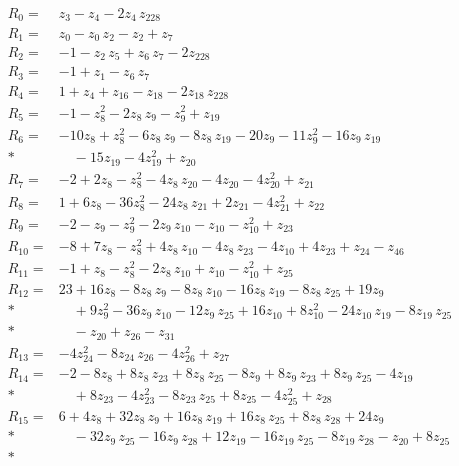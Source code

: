 \documentclass[11pt]{article}
\theoremstyle{remark}\newtheorem{remark}[theorem]{Remark}
\begin{document}
\begingroup
\small
\setlength{\jot}{3pt}
\allowdisplaybreaks[4]
\begin{align*}
R_{0}={}& z_{3} - z_{4} - 2z_{4}\,z_{228} \\[2pt]
R_{1}={}& z_{0} - z_{0}\,z_{2} - z_{2} + z_{7} \\[2pt]
R_{2}={}& -1 - z_{2}\,z_{5} + z_{6}\,z_{7} - 2z_{228} \\[2pt]
R_{3}={}& -1 + z_{1} - z_{6}\,z_{7} \\[2pt]
R_{4}={}& 1 + z_{4} + z_{16} - z_{18} - 2z_{18}\,z_{228} \\[2pt]
R_{5}={}& -1 - z_{8}^{2} - 2z_{8}\,z_{9} - z_{9}^{2} + z_{19} \\[2pt]
R_{6}={}& -10z_{8} + z_{8}^{2} - 6z_{8}\,z_{9} - 8z_{8}\,z_{19} - 20z_{9} - 11z_{9}^{2} - 16z_{9}\,z_{19} \\*
&\quad  - 15z_{19} - 4z_{19}^{2} + z_{20} \\[2pt]
R_{7}={}& -2 + 2z_{8} - z_{8}^{2} - 4z_{8}\,z_{20} - 4z_{20} - 4z_{20}^{2} + z_{21} \\[2pt]
R_{8}={}& 1 + 6z_{8} - 36z_{8}^{2} - 24z_{8}\,z_{21} + 2z_{21} - 4z_{21}^{2} + z_{22} \\[2pt]
R_{9}={}& -2 - z_{9} - z_{9}^{2} - 2z_{9}\,z_{10} - z_{10} - z_{10}^{2} + z_{23} \\[2pt]
R_{10}={}& -8 + 7z_{8} - z_{8}^{2} + 4z_{8}\,z_{10} - 4z_{8}\,z_{23} - 4z_{10} + 4z_{23} + z_{24} - z_{46} \\[2pt]
R_{11}={}& -1 + z_{8} - z_{8}^{2} - 2z_{8}\,z_{10} + z_{10} - z_{10}^{2} + z_{25} \\[2pt]
R_{12}={}& 23 + 16z_{8} - 8z_{8}\,z_{9} - 8z_{8}\,z_{10} - 16z_{8}\,z_{19} - 8z_{8}\,z_{25} + 19z_{9} \\*
&\quad  + 9z_{9}^{2} - 36z_{9}\,z_{10} - 12z_{9}\,z_{25} + 16z_{10} + 8z_{10}^{2} - 24z_{10}\,z_{19} - 8z_{19}\,z_{25} \\*
&\quad  - z_{20} + z_{26} - z_{31} \\[2pt]
R_{13}={}& -4z_{24}^{2} - 8z_{24}\,z_{26} - 4z_{26}^{2} + z_{27} \\[2pt]
R_{14}={}& -2 - 8z_{8} + 8z_{8}\,z_{23} + 8z_{8}\,z_{25} - 8z_{9} + 8z_{9}\,z_{23} + 8z_{9}\,z_{25} - 4z_{19} \\*
&\quad  + 8z_{23} - 4z_{23}^{2} - 8z_{23}\,z_{25} + 8z_{25} - 4z_{25}^{2} + z_{28} \\[2pt]
R_{15}={}& 6 + 4z_{8} + 32z_{8}\,z_{9} + 16z_{8}\,z_{19} + 16z_{8}\,z_{25} + 8z_{8}\,z_{28} + 24z_{9} \\*
&\quad  - 32z_{9}\,z_{25} - 16z_{9}\,z_{28} + 12z_{19} - 16z_{19}\,z_{25} - 8z_{19}\,z_{28} - z_{20} + 8z_{25} \\*

\end{align*}
\end{document}
